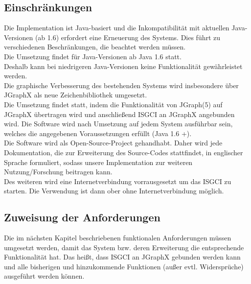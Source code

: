 \documentclass[11pt,a4paper]{article}
\begin{document}
	\subsection{Einschränkungen} %
	Die Implementation ist Java-basiert und die Inkompatibilität mit aktuellen Java-Versionen (ab 1.6) erfordert eine Erneuerung des Systems. Dies führt zu verschiedenen Beschränkungen, die beachtet werden müssen.\\
	Die Umsetzung findet für Java-Versionen ab Java 1.6 statt. \\
	Deshalb kann bei niedrigeren Java-Versionen keine Funktionalität gewährleistet werden.\\
	Die graphische Verbesserung des bestehenden Systems wird insbesondere über JGraphX als neue Zeichenbibliothek umgesetzt.\\
	Die Umsetzung findet statt, indem die Funktionalität von JGraph(5) auf JGraphX übertragen wird und anschließend ISGCI an JGraphX angebunden wird.  %
	Die Software wird nach Umsetzung auf jedem System ausführbar sein, welches die angegebenen Voraussetzungen erfüllt (Java 1.6 +).\\
	Die Software wird als Open-Source-Project %
gehandhabt. Daher wird jede Dokumentation, die zur Erweiterung des Source-Codes stattfindet, in englischer Sprache formuliert, sodass unsere Implementation zur weiteren Nutzung/Forschung beitragen kann. \\
	Des weiteren wird eine Internetverbindung vorrausgesetzt um das ISGCI zu starten. Die Verwendung ist dann ober ohne Internetverbindung möglich.
	\subsection{Zuweisung der Anforderungen} %
	Die im nächsten Kapitel beschriebenen funktionalen Anforderungen müssen umgesetzt werden, damit das System bzw. deren Erweiterung die entsprechende Funktionalität hat. Das heißt, dass ISGCI an JGraphX gebunden werden kann und alle bisherigen und hinzukommende Funktionen (außer evtl. Widersprüche) ausgeführt werden können.
\newpage
\end{document}
